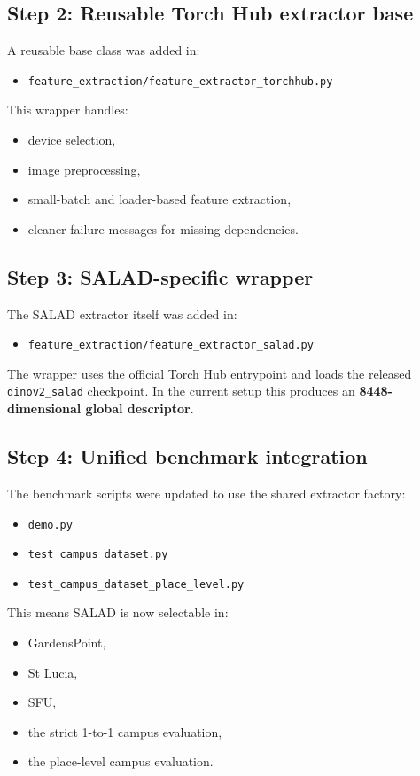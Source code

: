\documentclass[11pt]{article}
\begin{document}
\subsection*{Step 2: Reusable Torch Hub extractor base}
A reusable base class was added in:
\begin{itemize}[leftmargin=*]
  \item \texttt{feature\_extraction/feature\_extractor\_torchhub.py}
\end{itemize}

This wrapper handles:
\begin{itemize}[leftmargin=*]
  \item device selection,
  \item image preprocessing,
  \item small-batch and loader-based feature extraction,
  \item cleaner failure messages for missing dependencies.
\end{itemize}

\subsection*{Step 3: SALAD-specific wrapper}
The SALAD extractor itself was added in:
\begin{itemize}[leftmargin=*]
  \item \texttt{feature\_extraction/feature\_extractor\_salad.py}
\end{itemize}

The wrapper uses the official Torch Hub entrypoint and loads the released \texttt{dinov2\_salad} checkpoint. In the current setup this produces an \textbf{8448-dimensional global descriptor}.

\subsection*{Step 4: Unified benchmark integration}
The benchmark scripts were updated to use the shared extractor factory:
\begin{itemize}[leftmargin=*]
  \item \texttt{demo.py}
  \item \texttt{test\_campus\_dataset.py}
  \item \texttt{test\_campus\_dataset\_place\_level.py}
\end{itemize}

This means SALAD is now selectable in:
\begin{itemize}[leftmargin=*]
  \item GardensPoint,
  \item St Lucia,
  \item SFU,
  \item the strict 1-to-1 campus evaluation,
  \item the place-level campus evaluation.
\end{itemize}
\end{document}
